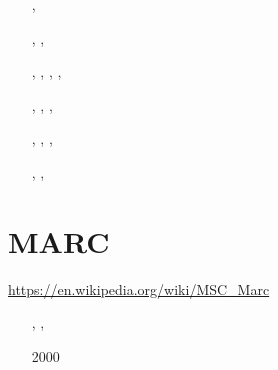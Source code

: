 \begin{small}
\begin{itemize}
\item[\twothousandtwelve]    \textcite{yatd12}
\item[\twothousandthirteen]  \textcite{yahb13}
\item[\twothousandfifteen]   \textcite{yadm15}
\item[\twothousandsixteen]   \textcite{dumy16},  \textcite{dupm16}
\item[\twothousandnineteen]  \textcite{chmd19},  \textcite{dual19},  \textcite{pedm19}
\item[\twothousandtwenty]    \textcite{poyd20},  \textcite{bedh20},  \textcite{casd20}, 
                             \textcite{chsm20},  \textcite{auwy20}
\item[\twothousandtwentyone] \textcite{pody21},  \textcite{cadm21},  \textcite{auwy21},
                             \textcite{poyd21}
\item[\twothousandtwentytwo] \textcite{auyd22},  \textcite{yadb22},  
                             \textcite{cads22},  \textcite{vacd22b}
\item[\twothousandtwentyfour] \textcite{bayd24}
\item[\twothousandtwentyfive] \textcite{dutm25}, \textcite{coyb25}, \textcite{dusk25}
\item[\twothousandtwentysix]  \textcite{schm26}
\end{itemize}
\end{small}



\section{MARC}

\url{https://en.wikipedia.org/wiki/MSC_Marc}

\begin{small}
\begin{itemize}
\item[\nineteenninetyseven] \textcite{nesg97}
\item[\nineteenninetynine]  \textcite{nesb99}, \textcite{nebc99}, \textcite{dins99}
\item[2000]  \textcite{gacn00}
\end{itemize}
\end{small}

